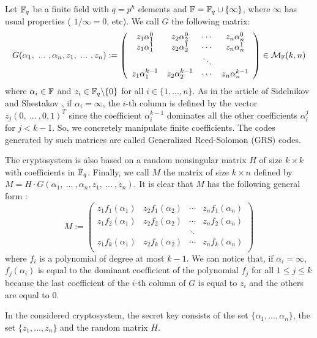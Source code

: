 \documentclass[a4paper]{article}
\begin{document}
Let $\mathbb{F}_q$ be a finite field with $q = p^h$ elements and $\mathbb{F} = \mathbb{F}_q \cup \{ \infty \}$, where $\infty$ has usual properties ( $1/\infty = 0$, etc). We call $G$ the following matrix:
$$ G(\alpha_1, \ ... \ , \alpha_n, z_1, \ ... \ , z_n) := \left(
\begin{array}{cccc}
z_1 \alpha_1^0 &  z_2 \alpha_2^0 & \cdots & z_n \alpha_n^0 \\
z_1 \alpha_1^1 &  z_2 \alpha_2^1 & \cdots & z_n \alpha_n^1 \\
 & & \ddots & \\
z_1 \alpha_1^{k-1} &  z_2 \alpha_2^{k-1} & \cdots & z_n \alpha_n^{k-1}
\end{array}
\right) \in \mathcal{M}_{\mathbb{F}}(k,n) $$
where $\alpha_i \in \mathbb{F}$ and $z_i \in \mathbb{F}_q\backslash\{0\}$ for all $i \in \{1,...,n\}$.
As in the article of Sidelnikov and Shestakov \cite{SidelShes92}, if $\alpha_i=\infty$, the $i$-th column is defined by the vector $z_j(0, \ ... \ , 0,1)^{T}$ since the coefficient $\alpha_i^{k-1}$ dominates all the other coefficients $\alpha_i^{j}$ for $j<k-1$.
So, we concretely manipulate finite coefficients. The codes generated by such matrices are called Generalized Reed-Solomon (GRS) codes.

The cryptosystem is also based on a random nonsingular matrix $H$ of size $k\times k$ with coefficients in $\mathbb{F}_q$. Finally, we call $M$ the matrix of size $k\times n$ defined by $M=H\cdot G(\alpha_1, \ ... \ , \alpha_n, z_1, \ ... \ , z_n)$.
It is clear that $M$ has the following general form :
$$ M := \left(
\begin{array}{cccc}
z_1f_1(\alpha_1) &  z_2f_1(\alpha_2) & \cdots & z_nf_1(\alpha_n) \\
z_1f_2(\alpha_1) &  z_2f_2(\alpha_2) & \cdots & z_nf_2(\alpha_n) \\
 & & \ddots & \\
z_1f_k(\alpha_1) &  z_2f_k(\alpha_2) & \cdots & z_nf_k(\alpha_n) \\
\end{array}
\right)$$
where $f_i$ is a polynomial of degree at most $k-1$.
We can notice that, if $\alpha_i = \infty$, $f_j(\alpha_i)$ is equal to the dominant coefficient of the polynomial $f_j$ for all $1\leq j\leq k$ because the last coefficient of the $i$-th column of $G$ is equal to $z_i$ and the others are equal to $0$.

In the considered cryptosystem, the secret key consists of the set $\{\alpha_1,... ,\alpha_n\}$, the set $\{z_1,... ,z_n\}$ and the random matrix $H$.
\end{document}
